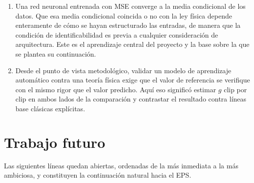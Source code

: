\documentclass[titlepage,11pt]{article}
\begin{document}
\begin{enumerate}
\item Una red neuronal entrenada con MSE converge a la media condicional de los
  datos. Que esa media condicional coincida o no con la ley física depende
  enteramente de cómo se hayan estructurado las entradas, de manera que la
  condición de identificabilidad es previa a cualquier consideración de
  arquitectura. Este es el aprendizaje central del proyecto y la base sobre la
  que se plantea su continuación.

\item Desde el punto de vista metodológico, validar un modelo de aprendizaje
  automático contra una teoría física exige que el valor de referencia se
  verifique con el mismo rigor que el valor predicho. Aquí eso significó
  estimar $g$ clip por clip en ambos lados de la comparación y contrastar el
  resultado contra líneas base clásicas explícitas.
\end{enumerate}


\section{Trabajo futuro}
\label{sec:trabajofuturo}

Las siguientes líneas quedan abiertas, ordenadas de la más inmediata a la más
ambiciosa, y constituyen la continuación natural hacia el EPS.
\end{document}
